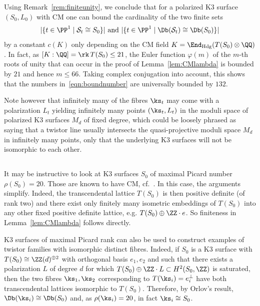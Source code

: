 \begin{rema}\label{rem:132}
Using Remark~\ref{rem:finiteunity}, we conclude that for a polarized K3 surface $(S_0,L_0)$ with CM one can bound the cardinality of the two finite sets
\begin{equation}\label{eqn:boundnumber}
|\{t\in\PP^1\mid{\mathcal S}_t\cong S_0\}|\text{ and }|\{t\in\PP^1\mid\Db({\mathcal S}_t)\cong\Db(S_0)\}|
\end{equation}
by a constant $c(K)$ only depending on the CM field $K=\End_{\rm Hdg}(T(S_0)\otimes\QQ)$. In fact, as $[K:\QQ]=\rk\, T(S_0)\leq 21$, the Euler function $\varphi(m)$ of the $m$-th roots of unity that can occur in the proof of Lemma~\ref{lem:CMlambda} is bounded by $21$ and hence $m\leq 66$. Taking complex conjugation into account, this shows that the numbers in~\eqref{eqn:boundnumber} are universally bounded by $132$.
\end{rema}

Note however that infinitely many of the fibres $\ks_t$ may come with a polarization $L_t$ yielding infinitely many points $(\ks_t,L_t)$ in the moduli space of polarized K3 surfaces $M_d$ of fixed degree, which could be loosely phrased as saying that a twistor line usually intersects the quasi-projective moduli space $M_d$ in infinitely many points, only that the underlying K3 surfaces will not be isomorphic to each other.

\subsection{}
It may be instructive to look at K3 surfaces $S_0$ of maximal Picard number $\rho(S_0)=20$. Those are known to have CM, cf.~\cite[Remark~3.3.10]{HuyK3}. In this case, the arguments simplify. Indeed, the transcendental lattice $T(S_0)$ is then positive definite (of rank two) and there exist only finitely many isometric embeddings of $T(S_0)$ into any other fixed positive definite lattice, e.g. $T(S_0)\oplus\ZZ\cdot e$. So finiteness in Lemma~\ref{lem:CMlambda} follows directly.

K3 surfaces of maximal Picard rank can also be used to construct examples of twistor families with isomorphic distinct fibres. Indeed, if $S_0$ is a K3 surface with $T(S_0)\cong\ZZ(d)^{\oplus 2}$ with orthogonal basis $e_1,e_2$ and such that there exists a polarization $L$ of degree $d$ for which $T(S_0)\oplus\ZZ\cdot L\subset H^2(S_0,\ZZ)$ is saturated, then the two fibres $\ks_1,\ks_2$ corresponding to $T(\ks_i)=e_i^\perp$ have both transcendental lattices isomorphic to $T(S_0)$. Therefore, by Orlov's result, $\Db(\ks_i)\cong\Db(S_0)$ and, as $\rho(\ks_i)=20$, in fact $\ks_i\cong S_0$.

